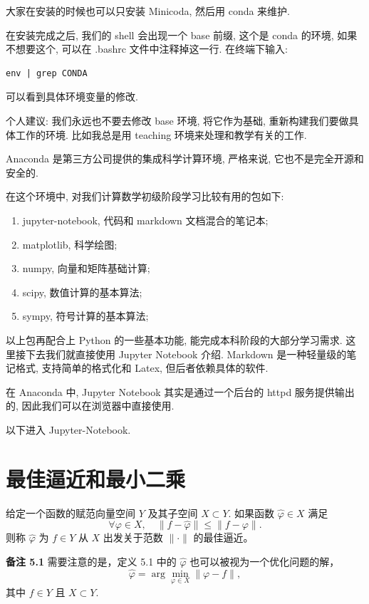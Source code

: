 \documentclass[a4paper]{ctexart}
\begin{document}
{大家在安装的时候也可以只安装 Minicoda, 然后用 conda 来维护.

在安装完成之后, 我们的 shell 会出现一个 base 前缀, 这个是 conda 的环境, 如果不想要这个,
可以在 .bashrc 文件中注释掉这一行. 在终端下输入:
\begin{verbatim}
env | grep CONDA
\end{verbatim}
可以看到具体环境变量的修改.

个人建议: 我们永远也不要去修改 base 环境, 将它作为基础, 重新构建我们要做具体工作的环境.
比如我总是用 teaching 环境来处理和教学有关的工作.

Anaconda 是第三方公司提供的集成科学计算环境, 严格来说, 它也不是完全开源和安全的.

在这个环境中, 对我们计算数学初级阶段学习比较有用的包如下:

\begin{enumerate}
\item jupyter-notebook, 代码和 markdown 文档混合的笔记本;
\item matplotlib, 科学绘图;
\item numpy, 向量和矩阵基础计算;
\item scipy, 数值计算的基本算法;
\item sympy, 符号计算的基本算法;
\end{enumerate}

以上包再配合上 Python 的一些基本功能, 能完成本科阶段的大部分学习需求.
这里接下去我们就直接使用 Jupyter Notebook 介绍. Markdown 是一种轻量级的笔记格式,
支持简单的格式化和 Latex, 但后者依赖具体的软件. 

在 Anaconda 中, Jupyter Notebook 其实是通过一个后台的 httpd 服务提供输出的,
因此我们可以在浏览器中直接使用.

以下进入 Jupyter-Notebook.

\section{最佳逼近和最小二乘}

 给定一个函数的赋范向量空间 \( Y \) 及其子空间 \( X \subset Y \). 如果函数 \( \hat{\varphi} \in X \) 满足
\[
  \forall \varphi \in X, \quad \|f - \hat{\varphi}\| \leq \|f - \varphi\|. \tag{5.1}
\]
则称 \( \hat{\varphi} \) 为 \( f \in Y \) 从 \( X \) 出发关于范数 \( \|\cdot\| \) 的最佳逼近。

\noindent \textbf{备注 5.1} 需要注意的是，定义 5.1 中的 \( \hat{\varphi} \) 也可以被视为一个优化问题的解，
\[
  \hat{\varphi} = \arg\min_{\varphi \in X} \|\varphi - f\|,
\]
其中 \( f \in Y \) 且 \( X \subset Y \).

}
\end{document}
